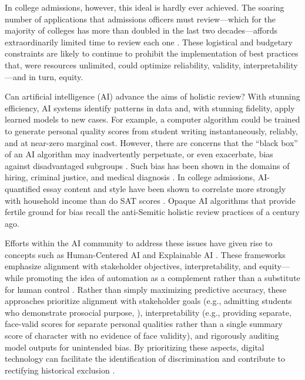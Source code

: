 \documentclass[11pt]{report}
\begin{document}
\begin{mainf}
In college admissions, however, this ideal is hardly ever achieved. The soaring number of applications that admissions officers must review—which for the majority of colleges has more than doubled in the last two decades—affords extraordinarily limited time to review each one \cite{hoover_working_2017,korn_elite_2018}. These logistical and budgetary constraints are likely to continue to prohibit the implementation of best practices that, were resources unlimited, could optimize reliability, validity, interpretability—and in turn, equity.

Can artificial intelligence (AI) advance the aims of holistic review? With stunning efficiency, AI systems identify patterns in data and, with stunning fidelity, apply learned models to new cases. For example, a computer algorithm could be trained to generate personal quality scores from student writing instantaneously, reliably, and at near-zero marginal cost. However, there are concerns that the “black box” of an AI algorithm may inadvertently perpetuate, or even exacerbate, bias against disadvantaged subgroups \cite{tay_conceptual_2022,hickman_automated_2022}. Such bias has been shown in the domains of hiring, criminal justice, and medical diagnosis \cite{manyika_what_2019, obermeyer_dissecting_2019, ensign_runaway_2018}. In college admissions, AI-quantified essay content and style have been shown to correlate more strongly with household income than do SAT scores \cite{alvero_essay_2021}. Opaque AI algorithms that provide fertile ground for bias recall the anti-Semitic holistic review practices of a century ago. %

Efforts within the AI community to address these issues have given rise to concepts such as Human-Centered AI \cite{riedl_humancentered_2019, shneiderman_human-centered_2020} and Explainable AI \cite{gunning_xaiexplainable_2019}. 
These frameworks emphasize alignment with stakeholder objectives, interpretability, and equity---while promoting the idea of automation as a complement rather than a substitute for human control \cite{shneiderman_human-centered_2020}. 
    Rather than simply maximizing predictive accuracy, these approaches prioritize alignment with stakeholder goals (e.g., admitting students who demonstrate prosocial purpose, \cite{noauthor_our_2021}), interpretability (e.g., providing separate, face-valid scores for separate personal qualities rather than a single summary score of character with no evidence of face validity), and rigorously auditing model outputs for unintended bias. By prioritizing these aspects, digital technology can facilitate the identification of discrimination and contribute to rectifying historical exclusion \cite{lobel_equality_2022}.


\end{mainf}
\end{document}
